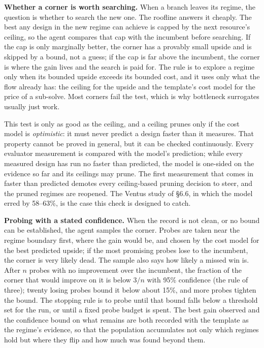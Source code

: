 \documentclass[11pt]{article}
\begin{document}
\textbf{Whether a corner is worth searching.} When a branch leaves its regime, the question is whether to search the new one. The roofline answers it cheaply. The best any design in the new regime can achieve is capped by the next resource's ceiling, so the agent compares that cap with the incumbent before searching. If the cap is only marginally better, the corner has a provably small upside and is skipped by a bound, not a guess; if the cap is far above the incumbent, the corner is where the gain lives and the search is paid for. The rule is to explore a regime only when its bounded upside exceeds its bounded cost, and it uses only what the flow already has: the ceiling for the upside and the template's cost model for the price of a sub-solve. Most corners fail the test, which is why bottleneck surrogates usually just work.

This test is only as good as the ceiling, and a ceiling prunes only if the cost model is \emph{optimistic}: it must never predict a design faster than it measures. That property cannot be proved in general, but it can be checked continuously. Every evaluator measurement is compared with the model's prediction; while every measured design has run no faster than predicted, the model is one-sided on the evidence so far and its ceilings may prune. The first measurement that comes in faster than predicted demotes every ceiling-based pruning decision to steer, and the pruned regimes are reopened. The Ventus study of §6.6, in which the model erred by 58--63\%, is the case this check is designed to catch.

\textbf{Probing with a stated confidence.} When the record is not clean, or no bound can be established, the agent samples the corner. Probes are taken near the regime boundary first, where the gain would be, and chosen by the cost model for the best predicted upside; if the most promising probes lose to the incumbent, the corner is very likely dead. The sample also says how likely a missed win is. After \(n\) probes with no improvement over the incumbent, the fraction of the corner that would improve on it is below \(3/n\) with 95\% confidence (the rule of three); twenty losing probes bound it below about 15\%, and more probes tighten the bound. The stopping rule is to probe until that bound falls below a threshold set for the run, or until a fixed probe budget is spent. The best gain observed and the confidence bound on what remains are both recorded with the template as the regime's evidence, so that the population accumulates not only which regimes hold but where they flip and how much was found beyond them.
\end{document}
